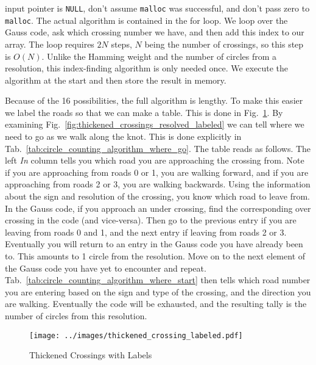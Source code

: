 \documentclass{article}
\theoremstyle{plain}
\begin{document}
        input pointer is \texttt{NULL}, don't assume \texttt{malloc} was
        successful, and don't pass zero to \texttt{malloc}. The actual algorithm
        is contained in the for loop. We loop over the Gauss code, ask which
        crossing number we have, and then add this index to our array. The
        loop requires $2N$ steps, $N$ being the number of crossings, so this
        step is $O(N)$. Unlike the Hamming weight and the number of circles
        from a resolution, this index-finding algorithm is only needed once. We
        execute the algorithm at the start and then store the result in
        memory.
        \par\hfill\par
        Because of the 16 possibilities, the full algorithm is lengthy. To make
        this easier we label the roads so that we can make a table. This is
        done in Fig.~\ref{fig:thickened_crossings_labeled}. By examining
        Fig.~\ref{fig:thickened_crossings_resolved_labeled} we can tell where
        we need to go as we walk along the knot. This is done explicitly in
        Tab.~\ref{tab:circle_counting_algorithm_where_go}. The table reads as follows.
        The left \textit{In} column tells you which road you are approaching the
        crossing from. Note if you are approaching from roads 0 or 1, you are
        walking forward, and if you are approaching from roads 2 or 3, you are
        walking backwards. Using the information about the sign and resolution
        of the crossing, you know which road to leave from. In the Gauss code,
        if you approach an under crossing, find the corresponding over crossing
        in the code (and vice-versa). Then go to the previous entry if you are
        leaving from roads 0 and 1, and the next entry if leaving from roads
        2 or 3. Eventually you will return to an entry in
        the Gauss code you have already been to. This amounts to 1 circle from
        the resolution. Move on to the next element of the Gauss code you have
        yet to encounter and repeat. Tab.~\ref{tab:circle_counting_algorithm_where_start}
        then tells which road number you are entering based on the sign and type
        of the crossing, and the direction you are walking. Eventually the code
        will be exhausted, and the resulting tally is the number of
        circles from this resolution.
        \begin{figure}
            \centering
            \texttt{[image: ../images/thickened\_crossing\_labeled.pdf]}
            \caption{Thickened Crossings with Labels}
            \label{fig:thickened_crossings_labeled}
        \end{figure}
\end{document}
